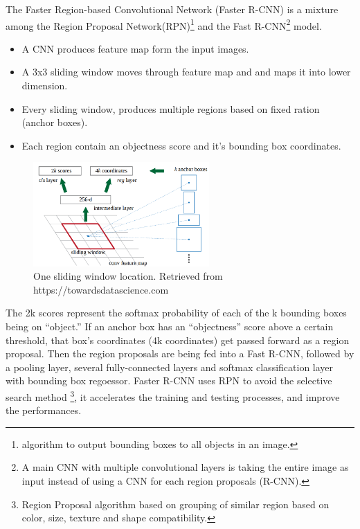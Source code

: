 \documentclass[12pt]{report}
\begin{document}
The Faster Region-based Convolutional Network (Faster R-CNN) is a  mixture among  
the Region Proposal Network(RPN)\footnote{algorithm to output bounding boxes to all objects in an image.} 
and the Fast R-CNN\footnote{A main CNN with multiple convolutional layers is taking the entire image as input instead of using a CNN for each region proposals (R-CNN).} model.
\begin{itemize}
    \item A CNN produces feature map form the input images.
    \item A 3x3 sliding window moves through feature map and and maps it into lower dimension.
    \item Every sliding window, produces multiple regions based on fixed ration (anchor boxes).
    \item Each region contain an objectness score and it's bounding box coordinates.
\end{itemize}
\begin{figure}[h]
    \centering
    \includegraphics[width=0.6\textwidth]{./images/cfm.png}
    \caption{One sliding window location. Retrieved from https://towardsdatascience.com}
    \label{fig:frcnn}
\end{figure} 
The 2k scores represent the softmax probability of each of the k bounding boxes being on “object.”
If an anchor box has an “objectness” score above a certain threshold, that box’s coordinates (4k coordinates) get passed forward as a region proposal.
Then the region proposals are being fed into a Fast R-CNN, followed by a pooling layer, several fully-connected layers
and softmax classification layer with bounding box regoessor.
Faster R-CNN uses RPN to avoid the 
selective search method \footnote{ Region Proposal algorithm based on grouping of similar region based on color, size, texture and shape compatibility.}, 
it accelerates the training and testing 
processes, and improve the performances. \cite{Ren2017a}
\end{document}
